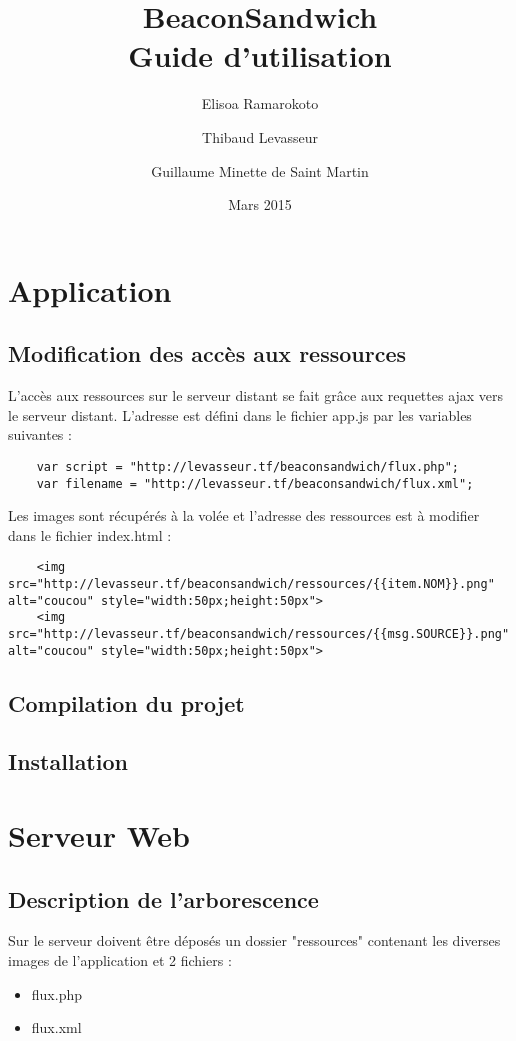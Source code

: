 \documentclass{report}
\title{\textbf{BeaconSandwich} \\ Guide d'utilisation}
\author{Elisoa Ramarokoto \and Thibaud Levasseur \and Guillaume Minette de Saint Martin }
\date{Mars 2015}
\begin{document}
\maketitle
\tableofcontents

\chapter{Application}

\section{Modification des accès aux ressources}
L'accès aux ressources sur le serveur distant se fait grâce aux requettes ajax vers le serveur distant. L'adresse est défini dans le fichier app.js par les variables suivantes :
\begin{verbatim}
    var script = "http://levasseur.tf/beaconsandwich/flux.php";
    var filename = "http://levasseur.tf/beaconsandwich/flux.xml";
\end{verbatim}

Les images sont récupérés à la volée et l'adresse des ressources est à modifier dans le fichier index.html :
\begin{verbatim}
    <img src="http://levasseur.tf/beaconsandwich/ressources/{{item.NOM}}.png" alt="coucou" style="width:50px;height:50px">
	<img src="http://levasseur.tf/beaconsandwich/ressources/{{msg.SOURCE}}.png" alt="coucou" style="width:50px;height:50px">
\end{verbatim}

\section{Compilation du projet}


\section{Installation}

\chapter{Serveur Web}

\section{Description de l'arborescence }
Sur le serveur doivent être déposés un dossier "ressources" contenant les diverses images de l'application et 2 fichiers :
\begin{itemize}
	\item flux.php
	\item flux.xml
\end{itemize}
\end{document}
